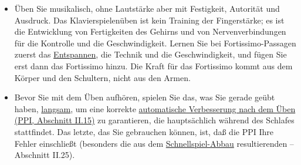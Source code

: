 \begin{itemize}
\item Üben Sie musikalisch, ohne Lautstärke aber mit Festigkeit, Autorität und Ausdruck.
Das Klavierspielenüben ist kein Training der Fingerstärke; es ist die Entwicklung von Fertigkeiten des Gehirns und von Nervenverbindungen für die Kontrolle und die Geschwindigkeit.
Lernen Sie bei Fortissimo-Passagen zuerst das \hyperref[c1ii14]{Entspannen}, die Technik und die Geschwindigkeit, und fügen Sie erst dann das Fortissimo hinzu.
Die Kraft für das Fortissimo kommt aus dem Körper und den Schultern, nicht aus den Armen.

\item Bevor Sie mit dem Üben aufhören, spielen Sie das, was Sie gerade geübt haben, \hyperref[c1ii17]{langsam}, um eine korrekte \hyperref[c1ii15]{automatische Verbesserung nach dem Üben (PPI, Abschnitt II.15)} zu garantieren, die hauptsächlich während des Schlafes stattfindet.
Das letzte, das Sie gebrauchen können, ist, daß die PPI Ihre Fehler einschließt (besonders die aus dem \hyperref[fpd]{Schnellspiel-Abbau} resultierenden -- Abschnitt II.25).
\end{itemize}




